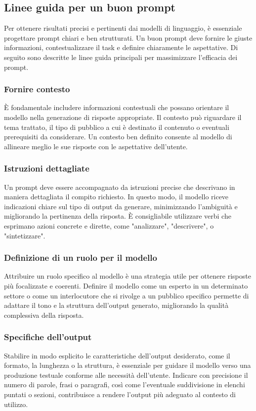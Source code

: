 \documentclass[target=mst,aauheader=,style=]{thud}
\begin{document}
\subsection{Linee guida per un buon prompt}
Per ottenere risultati precisi e pertinenti dai modelli di linguaggio, è essenziale progettare prompt chiari e ben strutturati. Un buon prompt deve fornire le giuste informazioni, contestualizzare il task e definire chiaramente le aspettative. Di seguito sono descritte le linee guida principali per massimizzare l'efficacia dei prompt.\cite{vogelsang_2024}\cite{chen_2023}

\subsubsection{Fornire contesto}
È fondamentale includere informazioni contestuali che possano orientare il modello nella generazione di risposte appropriate. Il contesto può riguardare il tema trattato, il tipo di pubblico a cui è destinato il contenuto o eventuali prerequisiti da considerare. Un contesto ben definito consente al modello di allineare meglio le sue risposte con le aspettative dell’utente.

\subsubsection{Istruzioni dettagliate}
Un prompt deve essere accompagnato da istruzioni precise che descrivano in maniera dettagliata il compito richiesto. In questo modo, il modello riceve indicazioni chiare sul tipo di output da generare, minimizzando l'ambiguità e migliorando la pertinenza della risposta. È consigliabile utilizzare verbi che esprimano azioni concrete e dirette, come "analizzare", "descrivere", o "sintetizzare".

\subsubsection{Definizione di un ruolo per il modello}
Attribuire un ruolo specifico al modello è una strategia utile per ottenere risposte più focalizzate e coerenti. Definire il modello come un esperto in un determinato settore o come un interlocutore che si rivolge a un pubblico specifico permette di adattare il tono e la struttura dell’output generato, migliorando la qualità complessiva della risposta.

\subsubsection{Specifiche dell’output}
Stabilire in modo esplicito le caratteristiche dell’output desiderato, come il formato, la lunghezza o la struttura, è essenziale per guidare il modello verso una produzione testuale conforme alle necessità dell’utente. Indicare con precisione il numero di parole, frasi o paragrafi, così come l’eventuale suddivisione in elenchi puntati o sezioni, contribuisce a rendere l’output più adeguato al contesto di utilizzo.
\end{document}
